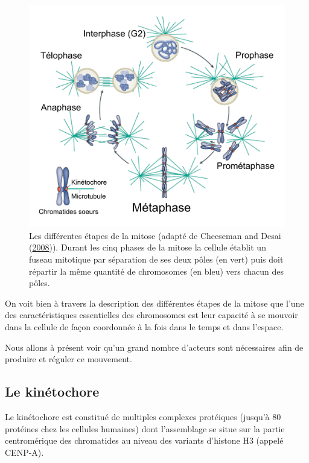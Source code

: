 \documentclass[12pt,a4paper,twoside,openright]{book}
\begin{document}
\begin{figure}[htbp]
\centering
\includegraphics{figures/intro/mitosis.png}
\caption[Les différentes étapes de la mitose]{\label{fig:mitosis}Les
différentes étapes de la mitose (adapté de Cheeseman and Desai
(\protect\hyperlink{ref-Cheeseman2008}{2008})). Durant les cinq phases
de la mitose la cellule établit un fuseau mitotique par séparation de
ses deux pôles (en vert) puis doit répartir la même quantité de
chromosomes (en bleu) vers chacun des pôles.}
\end{figure}

On voit bien à travers la description des différentes étapes de la
mitose que l'une des caractéristiques essentielles des chromosomes est
leur capacité à se mouvoir dans la cellule de façon coordonnée à la fois
dans le temps et dans l'espace.

Nous allons à présent voir qu'un grand nombre d'acteurs sont nécessaires
afin de produire et réguler ce mouvement.

\subsection{Le kinétochore}\label{le-kinuxe9tochore}

Le kinétochore est constitué de multiples complexes protéiques (jusqu'à
80 protéines chez les cellules humaines) dont l'assemblage se situe sur
la partie centromérique des chromatides au niveau des variants d'histone
H3 (appelé CENP-A).
\end{document}
